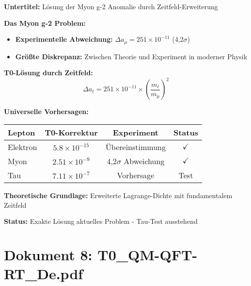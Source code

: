 \documentclass[12pt,a4paper]{article}
\begin{document}
	\begin{documentbox}
		\textbf{Untertitel:} Lösung der Myon g-2 Anomalie durch Zeitfeld-Erweiterung
		
		\textbf{Das Myon g-2 Problem:}
		\begin{itemize}
			\item \textbf{Experimentelle Abweichung:} $\Delta a_\mu = 251 \times 10^{-11}$ (4,2$\sigma$)
			\item \textbf{Größte Diskrepanz:} Zwischen Theorie und Experiment in moderner Physik
		\end{itemize}
		
		\textbf{T0-Lösung durch Zeitfeld:}
		\begin{equation}
			\boxed{\Delta a_\ell = 251 \times 10^{-11} \times \left(\frac{m_\ell}{m_\mu}\right)^2}
		\end{equation}
		
		\textbf{Universelle Vorhersagen:}
		\begin{center}
			\begin{tabular}{lccc}
				\toprule
				\textbf{Lepton} & \textbf{T0-Korrektur} & \textbf{Experiment} & \textbf{Status} \\
				\midrule
				Elektron & $5.8 \times 10^{-15}$ & Übereinstimmung & $\checkmark$ \\
				Myon & $2.51 \times 10^{-9}$ & 4,2$\sigma$ Abweichung & $\checkmark$ \\
				Tau & $7.11 \times 10^{-7}$ & Vorhersage & Test \\
				\bottomrule
			\end{tabular}
		\end{center}
		
		\textbf{Theoretische Grundlage:} Erweiterte Lagrange-Dichte mit fundamentalem Zeitfeld
		
		\textbf{Status:} Exakte Lösung aktuelles Problem - Tau-Test ausstehend
	\end{documentbox}
	
	\section{Dokument 8: T0\_QM-QFT-RT\_De.pdf}
	
\end{document}

